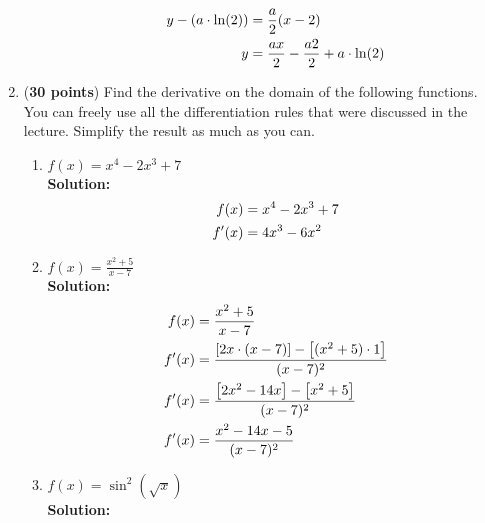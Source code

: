 \documentclass[a4paper]{article}
\begin{document}
\begin{enumerate}
\begin{enumerate}
\begin{align*}
	y - (a \cdot \ln(2)) &= \frac{a}{2}(x - 2)\notag\\
	y &= \frac{ax}{2} - \frac{a2}{2} + a \cdot \ln(2)\notag
\end{align*}	
	
	
\end{enumerate}


\item (\textbf{30 points}) Find the derivative on the domain of the following functions. You can freely use all the differentiation rules that were discussed in the lecture. Simplify the result as much as you can.

\begin{enumerate}
	\item $f(x) = x^4 - 2x^3 +7$\\
	\textbf{Solution:}\\
	
\begin{align}
	f(x) &= x^4 - 2x^3 +7\notag\\
	f'(x) &= 4x^3 - 6x^2\notag
\end{align}	
	
	\item $f(x) = \frac{x^2 + 5}{x - 7}$\\
	\textbf{Solution:}\\
	
\begin{align}
	f(x) &= \frac{x^2 + 5}{x - 7}\notag\\
	f'(x) &= \frac{\left[2x \cdot (x-7) \right] - \left[ (x^2+5) \cdot 1 \right]}{(x-7)^2}\notag\\
	f'(x) &= \frac{\left[ 2x^2 - 14x \right] - \left[ x^2 + 5 \right]}{(x-7)^2}\notag\\
	f'(x) &= \frac{x^2 - 14x - 5}{(x-7)^2}\notag
\end{align}		
	
	\item $f(x) = \sin^2 (\sqrt{x})$\\
	\textbf{Solution:}\\

	

\end{enumerate}
\end{enumerate}
\end{document}
